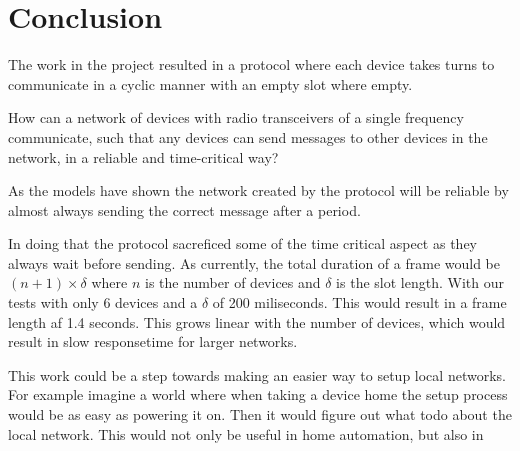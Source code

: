 \chapter{Conclusion}

The work in the project resulted in a protocol where each device takes turns to communicate in a cyclic manner with an empty slot where empty.


How can a network of devices with radio transceivers of a single frequency communicate, such that any devices can send messages to other devices in the network, in a reliable and time-critical way?

As the models have shown the network created by the protocol will be reliable by almost always sending the correct message after a period.


In doing that the protocol sacreficed some of the time critical aspect as they always wait before sending.
As currently, the total duration of a frame would be $(n + 1) \times \delta$ where $n$ is the number of devices and $\delta$ is the slot length.
With our tests with only 6 devices and a $\delta$ of 200 miliseconds.
This would result in a frame length af 1.4 seconds.
This grows linear with the number of devices, which would result in slow responsetime for larger networks.












This work could be a step towards making an easier way to setup local networks.
For example imagine a world where when taking a device home the setup process would be as easy as powering it on.
Then it would figure out what todo about the local network.
This would not only be useful in home automation, but also in 

